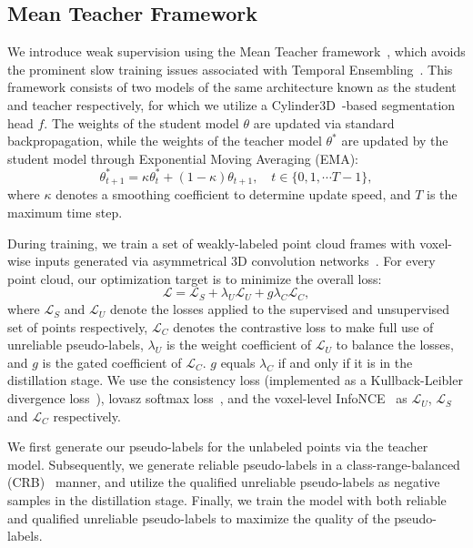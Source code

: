 \documentclass[10pt,twocolumn,letterpaper]{article}
\begin{document}
\subsection{Mean Teacher Framework}
\label{sec:mean-teacher}

We introduce weak supervision using the Mean Teacher framework~\cite{tarvainen2017mean}, which avoids the prominent slow training issues associated with Temporal Ensembling~\cite{laine2017temporal}. This framework consists of two models of the same architecture known as the student and teacher respectively, for which we utilize a Cylinder3D~\cite{zhu2021cylindrical}-based segmentation head $f$. The weights of the student model $\theta$ are updated via standard backpropagation, while the weights of the teacher model $\theta^*$ are updated by the student model through Exponential Moving Averaging (EMA):
\begin{equation}\label{equ:ema}
    \theta_{t+1}^* = \kappa  \theta_t^* + (1-\kappa ) \theta_{t+1}, \quad t \in \{0,1,\cdots T-1\},
\end{equation}
where $\kappa$ denotes a smoothing coefficient to determine update speed, and $T$ is the maximum time step.

During training, we train a set of weakly-labeled point cloud frames with voxel-wise inputs generated via asymmetrical 3D convolution networks~\cite{zhu2021cylindrical}. For every point cloud, our optimization target is to minimize the overall loss:
\begin{equation}\label{equ:overall_loss}
    \mathcal{L} = \mathcal{L}_S + \lambda_U \mathcal{L}_U + g \lambda_C \mathcal{L}_C,
\end{equation}
where $\mathcal{L}_S$ and $\mathcal{L}_U$ denote the losses applied to the supervised and unsupervised set of points respectively, $\mathcal{L}_C$ denotes the contrastive loss to make full use of unreliable pseudo-labels, $\lambda_U$ is the weight coefficient of $\mathcal{L}_U$ to balance the losses, and $g$ is the gated coefficient of $\mathcal{L}_C$. $g$ equals $\lambda_C$ if and only if it is in the distillation stage.
We use the consistency loss (implemented as a Kullback-Leibler divergence loss~\cite{hou2022pointtovoxel}), lovasz softmax loss~\cite{berman2018lovaszsoftmax}, and the voxel-level InfoNCE~\cite{oord2019representation} as $\mathcal{L}_U$, $\mathcal{L}_S$ and $\mathcal{L}_C$ respectively.

We first generate our pseudo-labels for the unlabeled points via the teacher model. Subsequently, we generate reliable pseudo-labels in a class-range-balanced (CRB)~\cite{Unal_2022_CVPR} manner, and utilize the qualified unreliable pseudo-labels as negative samples in the distillation stage. Finally, we train the model with both reliable and qualified unreliable pseudo-labels to maximize the quality of the pseudo-labels.
\end{document}
